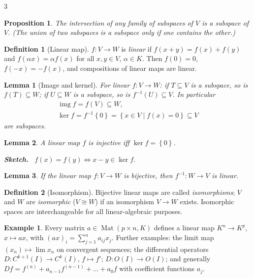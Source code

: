 \documentclass[10pt,a4paper,landscape]{article}
\theoremstyle{definition}
\newtheorem{defn}{Definition}[section]
\newtheorem{exm}{Example}[section]
\theoremstyle{plain}
\newtheorem{lem}{Lemma}[section]
\newtheorem{prop}{Proposition}[section]
\theoremstyle{remark}
\newcommand{\set}[1]{\left\{ #1 \right\}}
\DeclareMathOperator{\Mat}{Mat}
\DeclareMathOperator{\img}{img}
\newenvironment{proofsketch}{%
  \par\small\color{exgray}\textbf{Sketch.}\ }%
  {\par}
\begin{document}
\begin{multicols*}{3}
\begin{prop}
The intersection of any family of subspaces of $V$ is a subspace of $V$. (The union of two subspaces is a subspace only if one contains the other.)
\end{prop}

\begin{defn}[Linear map]
$f: V \to W$ is \emph{linear} if $f(x+y) = f(x)+f(y)$ and $f(\alpha x) = \alpha f(x)$ for all $x,y \in V$, $\alpha \in K$. Then $f(0) = 0$, $f(-x) = -f(x)$, and compositions of linear maps are linear.
\end{defn}

\begin{lem}[Image and kernel]
For linear $f: V \to W$: if $T \subseteq V$ is a subspace, so is $f(T) \subseteq W$; if $U \subseteq W$ is a subspace, so is $f^{-1}(U) \subseteq V$. In particular
\[
\begin{gathered}
\img f = f(V) \subseteq W,\\
\ker f = f^{-1}\set{0} = \set{x \in V \mid f(x) = 0} \subseteq V
\end{gathered}
\]
are subspaces.
\end{lem}

\begin{lem}
A linear map $f$ is injective iff $\ker f = \set{0}$.
\begin{proofsketch}
$f(x) = f(y) \Leftrightarrow x - y \in \ker f$.
\end{proofsketch}
\end{lem}

\begin{lem}
If the linear map $f: V \to W$ is bijective, then $f^{-1}: W \to V$ is linear.
\end{lem}

\begin{defn}[Isomorphism]
Bijective linear maps are called \emph{isomorphisms}; $V$ and $W$ are \emph{isomorphic} ($V \cong W$) if an isomorphism $V \to W$ exists. Isomorphic spaces are interchangeable for all linear-algebraic purposes.
\end{defn}

\begin{exm}
Every matrix $a \in \Mat(p \times n, K)$ defines a linear map $K^n \to K^p$, $x \mapsto ax$, with $(ax)_i = \sum_{j=1}^n a_{ij}x_j$. Further examples: the limit map $(x_n) \mapsto \lim x_n$ on convergent sequences; the differential operators $D: C^{k+1}(I) \to C^{k}(I)$, $f \mapsto f'$; $D: O(I) \to O(I)$; and generally $Df = f^{(n)} + a_{n-1}f^{(n-1)} + \dots + a_0 f$ with coefficient functions $a_j$.
\end{exm}


\end{multicols*}
\end{document}
